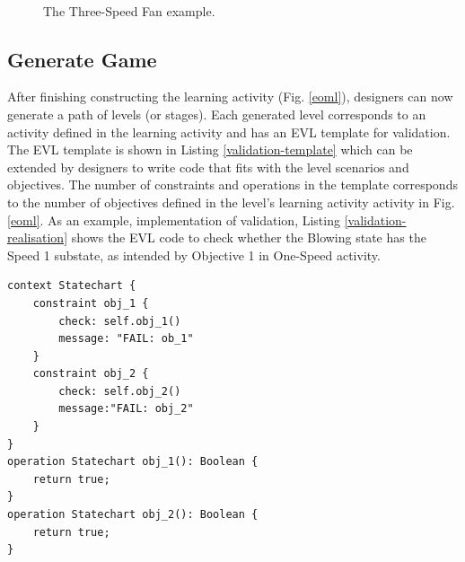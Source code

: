 \documentclass[conference]{IEEEtran}
\begin{document}
\begin{figure}[!t]
    \centering
    \\
	\caption{The Three-Speed Fan example.}
    \label{example-03}
\end{figure}


\subsection{Generate Game}
After finishing constructing the learning activity (Fig. \ref{eoml}), designers can now generate a path of levels (or stages). Each generated level corresponds to an activity defined in the learning activity and has an EVL template for validation. The EVL template is shown in Listing \ref{validation-template} which can be extended by designers to write code that fits with the level scenarios and objectives. The number of constraints and operations in the template corresponds to the number of objectives defined in the level's learning activity activity in Fig. \ref{eoml}. As an example, implementation of validation, Listing \ref{validation-realisation} shows the EVL code to check whether the Blowing state has the Speed 1 substate, as intended by Objective 1 in One-Speed activity.   

\begin{lstlisting}[style=interfaces,caption={Validation template for objectives in One-Speed Fan activity/level.},label=validation-template]
context Statechart {
    constraint obj_1 {
        check: self.obj_1()
        message: "FAIL: ob_1"
    }
    constraint obj_2 {
        check: self.obj_2()
        message:"FAIL: obj_2"
    }        
}
operation Statechart obj_1(): Boolean {
    return true;
}
operation Statechart obj_2(): Boolean {
    return true;
}
\end{lstlisting} 
\end{document}
